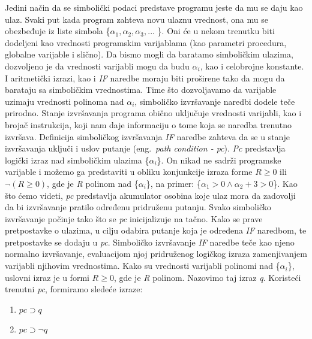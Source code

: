 \documentclass[a4paper]{article}
\begin{document}
Jedini način da se simbolički podaci predstave programu jeste da mu se daju kao ulaz. Svaki put kada program zahteva novu ulaznu vrednost, ona mu se obezbeđuje iz liste simbola \{$\alpha_1, \alpha_2, \alpha_3, ... $ \}. Oni će u nekom trenutku biti dodeljeni kao vrednosti programskim varijablama (kao parametri procedura, globalne varijable i slično). Da bismo mogli da baratamo simboličkim ulazima, dozvoljeno je da vrednosti varijabli mogu da budu $\alpha_i$, kao i celobrojne konstante. I aritmetički izrazi, kao i \textit{IF} naredbe moraju biti proširene tako da mogu da barataju sa simboličkim vrednostima. Time što dozvoljavamo da varijable uzimaju vrednosti polinoma nad $\alpha_i$, simboličko izvršavanje naredbi dodele teče prirodno.
Stanje izvršavanja programa obično uključuje vrednosti varijabli, kao i brojač instrukcija, koji nam daje informaciju o tome koja se naredba trenutno izvršava. Definicija simboličkog izvršavanja \textit{IF} naredbe zahteva da se u stanje izvršavanja uključi i uslov putanje (eng.~{\em path condition - pc}). \textit{Pc} predstavlja logički izraz nad simboličkim ulazima \{$\alpha_i$\}. On nikad ne sadrži programske varijable i možemo ga predstaviti u obliku konjunkcije izraza forme $R \ge 0$ ili  $\neg(R \ge 0)$, gde je \textit{R} polinom nad \{$\alpha_i$\}, na primer:  \{$\alpha_1 > 0 \wedge  \alpha_2 + 3 > 0 $\}. Kao što ćemo videti,  \textit{pc} predstavlja akumulator osobina koje ulaz mora da zadovolji da bi izvršavanje pratilo određenu pridruženu putanju. Svako simboličko izvršavanje počinje tako što se \textit{pc} inicijalizuje na tačno. Kako se prave pretpostavke o ulazima, u cilju odabira putanje koja je određena \textit{IF} naredbom, te pretpostavke se dodaju u \textit{pc}. Simboličko izvršavanje \textit{IF} naredbe teče kao njeno normalno izvršavanje, evaluacijom njoj pridruženog logičkog izraza zamenjivanjem varijabli njihovim vrednostima. Kako su vrednosti varijabli polinomi nad \{$\alpha_i$\}, uslovni izraz je u formi $R \ge 0$, gde je \textit{R} polinom. Nazovimo taj izraz \textit{q}. Koristeći trenutni \textit{pc}, formiramo sledeće izraze: 

\begin{enumerate}
	\item {$pc \supset q$}
	\item {$pc \supset \neg q $}
\end{enumerate}
\end{document}
